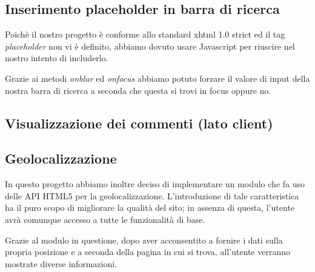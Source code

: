 \subsection{ Inserimento placeholder in barra di ricerca}

Poichè il nostro progetto è conforme allo standard xhtml 1.0 strict ed  il tag \textit{placeholder} non vi è definito, abbiamo dovuto usare Javascript per riuscire nel nostro intento di includerlo.


Grazie ai metodi \textit{onblur} ed \textit{onfocus} abbiamo potuto forzare il valore di input della nostra barra di ricerca a seconda che questa si trovi in focus oppure no.


\subsection{Visualizzazione dei commenti (lato client)}

\subsection{Geolocalizzazione}
In questo progetto abbiamo inoltre deciso di implementare un modulo che fa uso delle API HTML5 per la geolocalizzazione. L'introduzione di tale caratteristica ha il puro scopo di migliorare la qualità del sito; in assenza di questa, l'utente avrà comunque accesso a tutte le funzionalità di base.
\begin{flushleft}
Grazie al modulo in questione, dopo aver acconsentito a fornire i dati sulla propria posizione e a seconda della pagina in cui si trova, all'utente verranno mostrate diverse informazioni.
\end{flushleft}

